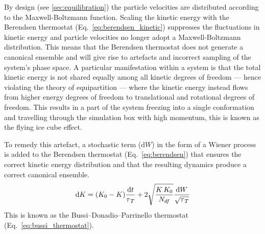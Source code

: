 By design (see \ref{sec:equilibration}) the particle velocities are distributed according to the Maxwell-Boltzmann function. Scaling the kinetic energy with the Berendsen thermostat (Eq.~\ref{eq:berendsen_kinetic}) suppresses the fluctuations in kinetic energy and particle velocities no longer adopt a Maxwell-Boltzmann distribution. This means that the Berendsen thermostat does not generate a canonical ensemble and will give rise to artefacts and incorrect sampling of the system's phase space. A particular manifestation within a system is that the total kinetic energy is not shared equally among all kinetic degrees of freedom --- hence violating the theory of equipartition --- where the kinetic energy instead flows from higher energy degrees of freedom to translational and rotational degrees of freedom. This results in a part of the system freezing into a single conformation and travelling through the simulation box with high momentum, this is known as the flying ice cube effect.\cite{harvey1998flying} 

To remedy this artefact, a stochastic term ($\mathrm{d}W$) in the form of a Wiener process is added to the Berendsen thermostat (Eq.~\ref{eq:berendsen}) that ensures the correct kinetic energy distribution and that the resulting dynamics produce a correct canonical ensemble.
%
\begin{equation} \label{eq:bussi_thermostat}
    \mathrm{d}K = (K_0 - K)\frac{\mathrm{d}t}{\tau_{\,T}} + 2 \sqrt{\frac{K\,K_0}{N_{df}}} \frac{\mathrm{d}W}{\sqrt{\tau_{\,T}}}
\end{equation}
This is known as the Bussi–Donadio–Parrinello thermostat (Eq.~\ref{eq:bussi_thermostat}).\cite{bussi2007canonical}

